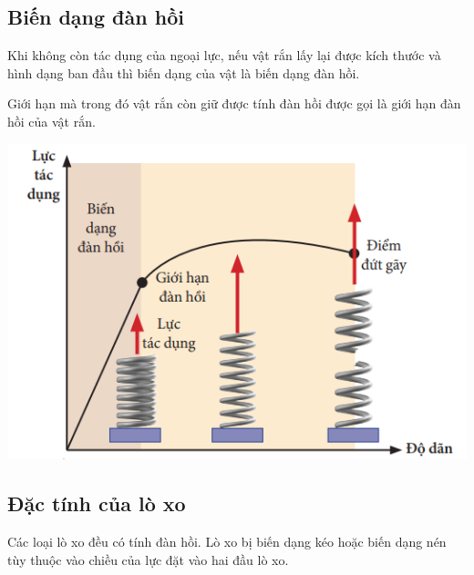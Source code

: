 \subsection{Biến dạng đàn hồi}
Khi không còn tác dụng của ngoại lực, nếu vật rắn lấy lại được kích thước và hình dạng ban đầu thì biến dạng của vật là biến dạng đàn hồi.

Giới hạn mà trong đó vật rắn còn giữ được tính đàn hồi được gọi là giới hạn đàn hồi của vật rắn.
\begin{center}
	\includegraphics[width=0.45\linewidth]{../figs/VN10-2023-PH-TP033-1}
\end{center}

\subsection{Đặc tính của lò xo}
Các loại lò xo đều có tính đàn hồi. Lò xo bị biến dạng kéo hoặc biến dạng nén tùy thuộc vào chiều của lực đặt vào hai đầu lò xo.

